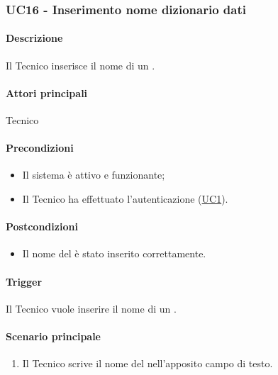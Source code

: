 \subsubsection{UC16 - Inserimento nome dizionario dati}\label{UC16}
\paragraph*{Descrizione}
Il Tecnico inserisce il nome di un .

\paragraph*{Attori principali}
Tecnico

\paragraph*{Precondizioni}
\begin{itemize}
  \item Il sistema è attivo e funzionante;
  \item Il Tecnico ha effettuato l'autenticazione (\hyperref[UC1]{UC1}).
\end{itemize}

\paragraph*{Postcondizioni}
\begin{itemize}
  \item Il nome del  è stato inserito correttamente.
\end{itemize}

\paragraph*{Trigger}
Il Tecnico vuole inserire il nome di un .

\paragraph*{Scenario principale}
\begin{enumerate}
  \item Il Tecnico scrive il nome del  nell'apposito campo di testo.
\end{enumerate}